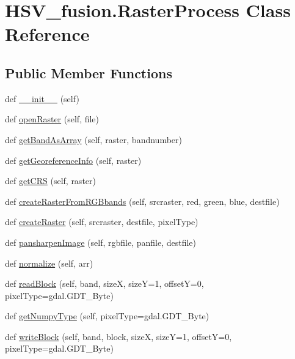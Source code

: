 \hypertarget{class_h_s_v__fusion_1_1_raster_process}{}\section{H\+S\+V\+\_\+fusion.\+Raster\+Process Class Reference}
\label{class_h_s_v__fusion_1_1_raster_process}
\subsection*{Public Member Functions}
\begin{DoxyCompactItemize}
\item 
def \mbox{\hyperlink{class_h_s_v__fusion_1_1_raster_process_a660f4894a7d050e58540babd60ec4269}{\+\_\+\+\_\+init\+\_\+\+\_\+}} (self)
\item 
def \mbox{\hyperlink{class_h_s_v__fusion_1_1_raster_process_ab7fc3ba16ff8bedfd26a45811efb93ec}{open\+Raster}} (self, file)
\item 
def \mbox{\hyperlink{class_h_s_v__fusion_1_1_raster_process_a55aa52ef0965575a867ff2b994d0855a}{get\+Band\+As\+Array}} (self, raster, bandnumber)
\item 
def \mbox{\hyperlink{class_h_s_v__fusion_1_1_raster_process_a357a8425c826c106f8f07106cf3178de}{get\+Georeference\+Info}} (self, raster)
\item 
def \mbox{\hyperlink{class_h_s_v__fusion_1_1_raster_process_a4d3dab8ca726b36c6ed38e6cb89a9116}{get\+C\+RS}} (self, raster)
\item 
def \mbox{\hyperlink{class_h_s_v__fusion_1_1_raster_process_a50e79f6868107a0c9234edfe7800443e}{create\+Raster\+From\+R\+G\+Bbands}} (self, srcraster, red, green, blue, destfile)
\item 
def \mbox{\hyperlink{class_h_s_v__fusion_1_1_raster_process_a04ccd0a5ef170740489a96842018ec3c}{create\+Raster}} (self, srcraster, destfile, pixel\+Type)
\item 
def \mbox{\hyperlink{class_h_s_v__fusion_1_1_raster_process_aca76f020e0abc7e7985a82381f989d9a}{pansharpen\+Image}} (self, rgbfile, panfile, destfile)
\item 
def \mbox{\hyperlink{class_h_s_v__fusion_1_1_raster_process_ab73a0820df58431093d3d6697c36beec}{normalize}} (self, arr)
\item 
def \mbox{\hyperlink{class_h_s_v__fusion_1_1_raster_process_a1c123d5883dc2c2783391cdb7ebfe738}{read\+Block}} (self, band, sizeX, sizeY=1, offsetY=0, pixel\+Type=gdal.\+G\+D\+T\+\_\+\+Byte)
\item 
def \mbox{\hyperlink{class_h_s_v__fusion_1_1_raster_process_aaa5f6ae93ead92ab03eefd80e1318296}{get\+Numpy\+Type}} (self, pixel\+Type=gdal.\+G\+D\+T\+\_\+\+Byte)
\item 
def \mbox{\hyperlink{class_h_s_v__fusion_1_1_raster_process_a602e8caa6f0961893dafcb169f191373}{write\+Block}} (self, band, block, sizeX, sizeY=1, offsetY=0, pixel\+Type=gdal.\+G\+D\+T\+\_\+\+Byte)
\end{DoxyCompactItemize}


